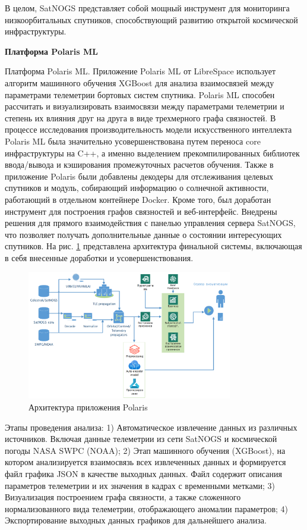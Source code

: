 \documentclass[12pt, a4paper]{extreport}
\begin{document}
В целом, SatNOGS представляет собой мощный инструмент для мониторинга низкоорбитальных спутников, способствующий развитию открытой космической инфраструктуры.

\newpage
{\Large \textbf{Платформа Polaris ML}}

Платформа Polaris ML. Приложение Polaris ML от LibreSpace использует алгоритм машинного обучения XGBoost для анализа взаимосвязей между параметрами телеметрии бортовых систем спутника. Polaris ML способен рассчитать и визуализировать взаимосвязи между параметрами телеметрии и степень их влияния друг на друга в виде трехмерного графа связностей. В процессе исследования производительность модели искусственного интеллекта Polaris ML была значительно усовершенствована путем переноса core инфраструктуры на C++, а именно выделением прекомпилированных библиотек ввода/вывода и кэширования промежуточных расчетов обучения. Также в приложение Polaris были добавлены декодеры для отслеживания целевых спутников и модуль, собирающий информацию о солнечной активности, работающий в отдельном контейнере Docker. Кроме того, был доработан инструмент для построения графов связностей и веб-интерфейс. Внедрены решения для прямого взаимодействия с панелью управления сервера SatNOGS, что позволяет получать дополнительные данные о состоянии интересующих спутников.
На рис. \ref{fig:polaris_architecture} представлена архитектура финальной системы, включающая в себя внесенные доработки и усовершенствования.

\begin{figure}[htbp]
	\centering
	\includegraphics[width=0.8\textwidth]{polaris_architecture.png}
	\caption{Архитектура приложения Polaris}
	\label{fig:polaris_architecture}
\end{figure}

Этапы проведения анализа: 1) Автоматическое извлечение данных из различных источников. Включая данные телеметрии из сети SatNOGS и космической погоды NASA SWPC (NOAA); 2) Этап машинного обучения \cite{xgboost}\cite{boumghar2018enhanced} (XGBoost), на котором анализируется взаимосвязь всех извлеченных данных и формируется файл графика JSON в качестве выходных данных. Файл содержит описания параметров телеметрии и их значения в кадрах с временными метками; 3) Визуализация построением графа связности, а также сложенного нормализованного вида телеметрии, отображающего аномалии параметров; 4) Экспортирование выходных данных графиков для дальнейшего анализа.
\end{document}
